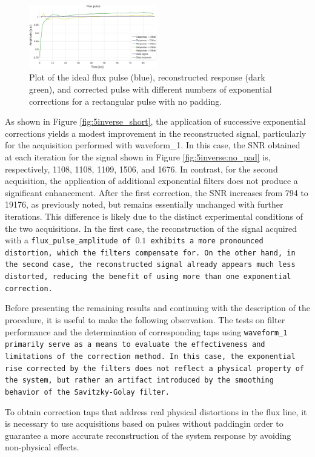 \begin{figure}[h!]
    \centering
    \includegraphics[width=0.5\textwidth]{figures/png/Cryoscope/filters_long/5_inverse.png}
    \caption{Plot of the ideal flux pulse (blue), reconstructed response (dark green), and corrected pulse with different numbers of exponential corrections for a rectangular pulse with no padding.}
    \label{fig:5inverse:long}
\end{figure} 

As shown in Figure \ref{fig:5inverse_short}, the application of successive exponential corrections yields a modest improvement in the reconstructed signal, particularly for the acquisition performed with waveform\_1.
In this case, the SNR obtained at each iteration for the signal shown in Figure \ref{fig:5inverse:no_pad} is, respectively, 1108, 1108, 1109, 1506, and 1676.
In contrast, for the second acquisition, the application of additional exponential filters does not produce a significant enhancement.
After the first correction, the SNR increases from 794 to 19176, as previously noted, but remains essentially unchanged with further iterations.
This difference is likely due to the distinct experimental conditions of the two acquisitions. 
In the first case, the reconstruction of the signal acquired with a \tt{flux\_pulse\_amplitude} of $0.1$ exhibits a more pronounced distortion, which the filters compensate for. 
On the other hand, in the second case, the reconstructed signal already appears much less distorted, reducing the benefit of using more than one exponential correction.

Before presenting the remaining results and continuing with the description of the procedure, it is useful to make the following observation.
The tests on filter performance and the determination of corresponding taps using \tt{waveform\_1} primarily serve as a means to evaluate the effectiveness and limitations of the correction method. 
In this case, the exponential rise corrected by the filters does not reflect a physical property of the system, but rather an artifact introduced by the smoothing behavior of the Savitzky-Golay filter.

To obtain correction taps that address real physical distortions in the flux line, it is necessary to use acquisitions based on pulses without paddingin order to guarantee a more accurate reconstruction of the system response by avoiding non-physical effects.


